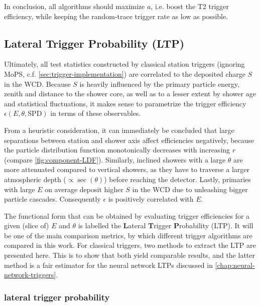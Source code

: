 In conclusion, all algorithms should maximize $a$, i.e. boost the T2 trigger efficiency, while keeping the random-trace trigger rate as low as possible.

\subsection{Lateral Trigger Probability (LTP)}
\label{ssec:lateral-trigger-probability}

Ultimately, all test statistics constructed by classical station triggers (ignoring MoPS, c.f. \autoref{sec:trigger-implementation}) are correlated to the deposited 
charge $S$ in the WCD. Because $S$ is heavily influenced by the primary particle energy, zenith and distance to the shower core, as well as to a lesser extent by 
shower age and statistical fluctuations, it makes sense to parametrize the trigger efficiency $\epsilon(E, \theta, \text{SPD})$ in terms of these observables. 

From a heuristic consideration, it can immediately be concluded that large separations between station and shower axis affect efficiencies negatively, because the 
particle distribution function monotonically decreases with increasing $r$ (compare \autoref{fig:component-LDF}). Similarly, inclined showers with a large $\theta$
are more attenuated compared to vertical showers, as they have to traverse a larger atmospheric depth ($\propto\sec\left(\theta\right)$) before reaching the 
detector. Lastly, primaries with large $E$ on average deposit higher $S$ in the WCD due to unleashing bigger particle cascades. Consequently $\epsilon$ is 
positively correlated with $E$.

The functional form that can be obtained by evaluating trigger efficiencies for a given (slice of) $E$ and $\theta$ is labelled the \textbf{L}ateral 
\textbf{T}rigger \textbf{P}robability (LTP). It will be one of the main comparison metrics, by which different trigger algorithms are compared in this work. For 
classical triggers, two methods to extract the LTP are presented here. This is to show that both yield comparable results, and the latter method is a fair 
estimator for the neural network LTPs discussed in \autoref{chap:neural-network-triggers}.

\subsubsection{\Offline lateral trigger probability}
\label{sssec:offline-ltp}

